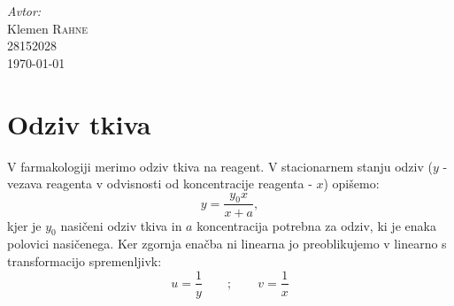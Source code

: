 \documentclass[slovene,11pt,a4paper]{article}
\numberwithin{equation}{section} %
\numberwithin{figure}{section} %
\numberwithin{table}{section} %
\begin{document}
\begin{titlepage}



\Large \emph{Avtor:}\\
Klemen \textsc{Rahne}\\
28152028\\[2cm]

{\large \today } \\[0.5cm] %

	

\end{titlepage}





\section{Odziv tkiva}

V farmakologiji merimo odziv tkiva na reagent. V stacionarnem stanju odziv ($y$ - vezava reagenta v odvisnosti od koncentracije reagenta - $x$) opišemo:
\begin{equation}
y=\frac{y_0 x}{x+a} ,
\end{equation}
kjer je $y_0$ nasičeni odziv tkiva in $a$ koncentracija potrebna za odziv, ki je enaka polovici nasičenega. Ker zgornja enačba ni linearna jo preoblikujemo v linearno s transformacijo spremenljivk:
\begin{equation*}
u=\frac{1}{y} \qquad  ;\qquad  v=\frac{1}{x}
\end{equation*}
\end{document}
